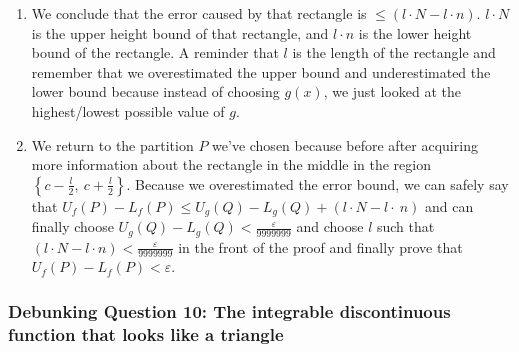 \documentclass[12pt]{article}
\theoremstyle{plain}
\theoremstyle{remark}
\theoremstyle{definition}
\begin{document}
\begin{enumerate}
  \begin{enumerate}
  \def\labelenumii{\alph{enumii}.}
  \item
    Go higher than \(f(c)\) or \(M\). We only worry about \(f(c)\) when
    \(x = c\), so \(M\) covers all the other cases: the maximum possible
    value of \(g\).
  \item
    Go lower than \(f(c)\) or \(- M\). We only worry about \(f(c)\) when
    \(x = c\), so \(- M\) covers all the other cases: the minimum
    possible value of \(g\).
  \item
    We end up with this expression:
    \(\min\left( f(c),\  - M \right) \leq f(x) \leq \max\left( f(c),\ M \right)\)
    We give aliases: \(n = \min\left( f(c),\  - M \right)\) and
    \(N = \max\left( f(c),\ M \right)\) although we totally didn't have
    to. The reason why we chose \(M\) and \(- M\) instead of some
    \(g(x)\) thing is because \(M\) and \(- M\) are constants and will
    always be an overestimate/underestimate of where \(g\) always is.
  \end{enumerate}
\item
  We conclude that the error caused by that rectangle is
  \(\leq (l \cdot N - l \cdot n)\). \(l \cdot N\) is the upper height
  bound of that rectangle, and \(l \cdot n\) is the lower height bound
  of the rectangle. A reminder that \(l\) is the length of the rectangle
  and remember that we overestimated the upper bound and underestimated
  the lower bound because instead of choosing \(g(x)\), we just looked
  at the highest/lowest possible value of \(g\).
\item
  We return to the partition \(P\) we've chosen because before after
  acquiring more information about the rectangle in the middle in the
  region \(\left\{ c - \frac{l}{2},\ c + \frac{l}{2} \right\}\). Because
  we overestimated the error bound, we can safely say that
  \(U_{f}(P) - L_{f}(P) \leq U_{g}(Q) - L_{g}(Q) + (l \cdot N - l \cdot \ n)\)
  and can finally choose
  \(U_{g}(Q) - L_{g}(Q) < \frac{\varepsilon}{9999999}\) and choose \(l\)
  such that \((l \cdot N - l \cdot n) < \frac{\varepsilon}{9999999}\) in
  the front of the proof and finally prove that
  \(U_{f}(P) - L_{f}(P) < \varepsilon\).
\end{enumerate}


\subsubsection{Debunking Question 10: The integrable discontinuous
function that looks like a
triangle}
\end{document}
